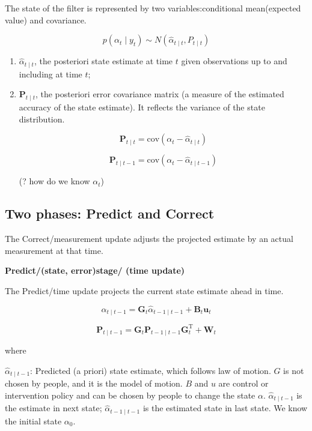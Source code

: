 The state of the filter is represented by two variables:conditional mean(expected value) and covariance.

$$p(\alpha_t \mid y_t) \sim N( \hat \alpha_{t \mid t}, P_{t \mid t})$$ 

\begin{enumerate}
	\item{$\hat{\alpha}_{t\mid t}$, the  posteriori state estimate at time $t$ given observations up to  and including at time $t$;}
	
	
	\item{$\mathbf{P}_{t\mid t}$, the posteriori error covariance matrix (a measure of the estimated accuracy of the state estimate). It reflects the variance of the state distribution.
		
		$$\mathbf{P}_{t\mid t} = \mathrm{cov}(\alpha_t - \hat{\alpha}_{t\mid t})$$
		
		$$\mathbf{P}_{t\mid t-1} = \mathrm{cov}(\alpha_t - \hat{\alpha}_{t\mid t-1})$$
		
		(? how do we know $\alpha_t$)
		}
	
\end{enumerate}




\subsection{Two phases: Predict and Correct} 


The Correct/measurement update adjusts the projected estimate by an actual measurement at that time.


\textbf{Predict/(state, error)stage/ (time update)} 


The Predict/time update projects the current state estimate ahead in time. 

$$\hat{\alpha}_{t\mid t-1} = \mathbf{G}_{t}\hat{\alpha}_{t-1\mid t-1} + \mathbf{B}_{t} \mathbf{u}_{t}$$



$$\mathbf{P}_{t\mid t-1} = \mathbf{G}_{t} \mathbf{P}_{t-1\mid t-1} \mathbf{G}_{t}^{\text{T}} + \mathbf{W}_{t}$$

where

$\hat{\alpha}_{t\mid t-1}$: Predicted (a priori) state estimate, which follows law of motion.  $G$ is not chosen by people, and it is the model of motion. $B$ and $u$ are control or intervention policy and can be chosen by people to change the state $\alpha$. $\hat{\alpha}_{t\mid t-1}$ is the estimate in next state; $\hat{\alpha}_{t-1\mid t-1}$ is the estimated state in last state. We know the initial state $\alpha_0$.    


